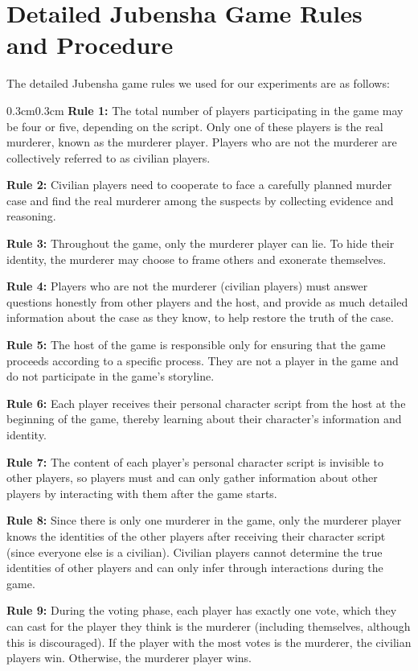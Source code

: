 \documentclass[11pt]{article}
\begin{document}
\section{Detailed Jubensha Game Rules and Procedure}

The detailed Jubensha game rules we used for our experiments are as follows: 

{
\setlength{\parindent}{0pt}
\setlength{\parskip}{0.8em}
{

\begin{adjustwidth}{0.3cm}{0.3cm}   
\ttfamily
\noindent \textbf{Rule 1:} The total number of players participating in the game may be four or five, depending on the script. Only one of these players is the real murderer, known as the murderer player. Players who are not the murderer are collectively referred to as civilian players.

\textbf{Rule 2:} Civilian players need to cooperate to face a carefully planned murder case and find the real murderer among the suspects by collecting evidence and reasoning.

\textbf{Rule 3:} Throughout the game, only the murderer player can lie. To hide their identity, the murderer may choose to frame others and exonerate themselves.

\textbf{Rule 4:} Players who are not the murderer (civilian players) must answer questions honestly from other players and the host, and provide as much detailed information about the case as they know, to help restore the truth of the case.

\textbf{Rule 5:} The host of the game is responsible only for ensuring that the game proceeds according to a specific process. They are not a player in the game and do not participate in the game's storyline.

\textbf{Rule 6:} Each player receives their personal character script from the host at the beginning of the game, thereby learning about their character's information and identity.

\textbf{Rule 7:} The content of each player's personal character script is invisible to other players, so players must and can only gather information about other players by interacting with them after the game starts.

\textbf{Rule 8:} Since there is only one murderer in the game, only the murderer player knows the identities of the other players after receiving their character script (since everyone else is a civilian). Civilian players cannot determine the true identities of other players and can only infer through interactions during the game.

\textbf{Rule 9:} During the voting phase, each player has exactly one vote, which they can cast for the player they think is the murderer (including themselves, although this is discouraged). If the player with the most votes is the murderer, the civilian players win. Otherwise, the murderer player wins.

\end{adjustwidth}
}
}
\end{document}
